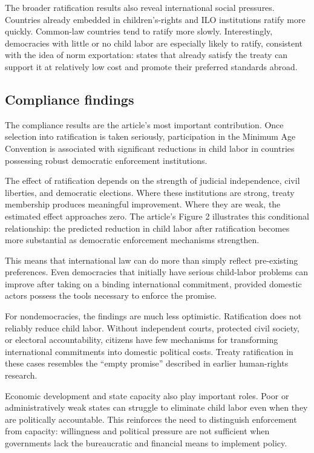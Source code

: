 The broader ratification results also reveal international social pressures. Countries already embedded in children's-rights and ILO institutions ratify more quickly. Common-law countries tend to ratify more slowly. Interestingly, democracies with little or no child labor are especially likely to ratify, consistent with the idea of norm exportation: states that already satisfy the treaty can support it at relatively low cost and promote their preferred standards abroad.

\subsection{Compliance findings}

The compliance results are the article's most important contribution. Once selection into ratification is taken seriously, participation in the Minimum Age Convention is associated with significant reductions in child labor in countries possessing robust democratic enforcement institutions.

The effect of ratification depends on the strength of judicial independence, civil liberties, and democratic elections. Where these institutions are strong, treaty membership produces meaningful improvement. Where they are weak, the estimated effect approaches zero. The article's Figure 2 illustrates this conditional relationship: the predicted reduction in child labor after ratification becomes more substantial as democratic enforcement mechanisms strengthen.

This means that international law can do more than simply reflect pre-existing preferences. Even democracies that initially have serious child-labor problems can improve after taking on a binding international commitment, provided domestic actors possess the tools necessary to enforce the promise.

For nondemocracies, the findings are much less optimistic. Ratification does not reliably reduce child labor. Without independent courts, protected civil society, or electoral accountability, citizens have few mechanisms for transforming international commitments into domestic political costs. Treaty ratification in these cases resembles the ``empty promise'' described in earlier human-rights research.

Economic development and state capacity also play important roles. Poor or administratively weak states can struggle to eliminate child labor even when they are politically accountable. This reinforces the need to distinguish enforcement from capacity: willingness and political pressure are not sufficient when governments lack the bureaucratic and financial means to implement policy.

